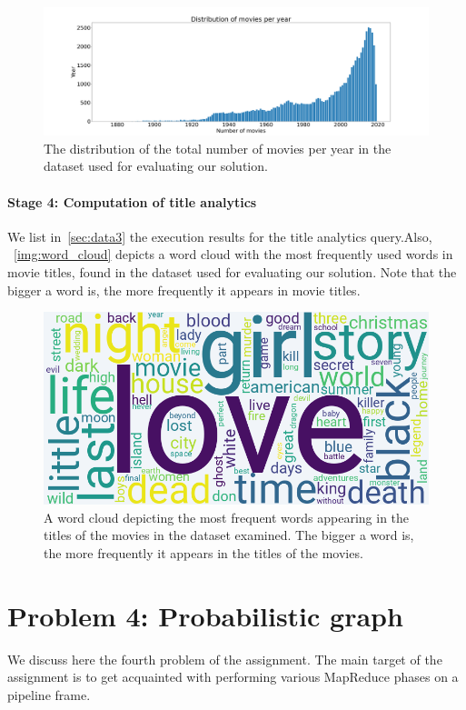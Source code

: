 \documentclass[acmlarge]{acmart}
\begin{document}
  \begin{figure}[tb!]
    \centering
    \includegraphics[width=\linewidth]{figures/movies per year}
    \caption{The distribution of the total number of movies per year in the dataset used for evaluating our solution.}
    \label{img:movies_per_year}
  \end{figure}

  \paragraph{Stage 4: Computation of title analytics}
  We list in~\autoref{sec:data3} the execution results for the title analytics query.Also, ~\autoref{img:word_cloud} depicts a word cloud with the most frequently used words in movie titles, found in the dataset used for evaluating our solution. Note that the bigger a word is, the more frequently it appears in movie titles.
  \begin{figure}[tb!]
    \centering
    \includegraphics[width=0.8\linewidth]{figures/word cloud}
    \caption{A word cloud depicting the most frequent words appearing in the titles of the movies in the dataset examined. The bigger a word is, the more frequently it appears in the titles of the movies.}
    \label{img:word_cloud}
  \end{figure}

  \section{Problem 4: Probabilistic graph}
  \label{sec:problem4}
  We discuss here the fourth problem of the assignment.
  The main target of the assignment is to get acquainted with performing various MapReduce phases on a pipeline frame.
\end{document}
